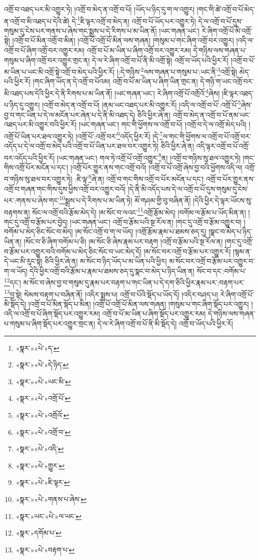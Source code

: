 འགྲོ་བ་འཐད་པར་མི་འགྱུར་ཏེ། །འགྲོ་བ་མེད་ན་འགྲོ་བ་པོ། །ཡོད་པ་ཉིད་དུ་ག་ལ་འགྱུར། །གང་གི་ཚེ་འགྲོ་བ་པོ་མེད་ན་འགྲོ་བ་མི་འཐད་པ་དེའི་ཚེ། དེ་\footnote{«སྣར་»«པེ་»ད་}ཇི་ལྟར་འགྲོ་བ་མེད་ན། འགྲོ་བ་པོ་ཡོད་པར་འགྱུར་ཏེ། དེ་ལ་འགྲོ་བ་པོ་དུས་གསུམ་དུ་ངེས་པར་གནས་པ་ཞེས་གང་སྨྲས་པ་དེ་རིགས་པ་མ་ཡིན་ནོ། །ཡང་གཞན་ཡང་། རེ་ཞིག་འགྲོ་པོ་མི་འགྲོ་སྟེ། །འགྲོ་བ་པོ་མིན་འགྲོ་བ་མིན། །འགྲོ་པོ་འགྲོ་པོ་མིན་ལས་གཞན། །གསུམ་པ་གང་ཞིག་འགྲོ་བར་འགྱུར། །འདི་ལ་འགྲོ་བ་པོ་ཞིག་འགྲོ་བར་འགྱུར་རམ། འགྲོ་བ་པོ་མ་ཡིན་པ་ཞིག་འགྲོ་བར་འགྱུར་རམ། དེ་གཉིས་ལས་གཞན་པ་གསུམ་པ་ཞིག་འགྲོ་བར་འགྱུར་གྲང་ན། དེ་ལ་རེ་ཞིག་འགྲོ་བ་པོ་ནི་མི་འགྲོ་སྟེ། འགྲོ་བ་ཡོད་པའི་ཕྱིར་རོ། །འགྲོ་བ་པོ་མ་ཡིན་པ་ཡང་མི་འགྲོ་སྟེ་འགྲོ་བ་མེད་པའི་ཕྱིར་རོ། །:དེ་གཉིས་\footnote{«སྣར་»«པེ་»དེ་ཉིད་}ལས་གཞན་པ་གསུམ་པ་:ཡང་ནི་\footnote{«སྣར་»«པེ་»ཡང་མི་}འགྲོ་སྟེ། མེད་པའི་ཕྱིར་རོ། །གང་ཞིག་ཡོད་ན་དེ་འགྲོ་བ་པོའམ། འགྲོ་བ་པོ་མ་ཡིན་པ་ཞིག་ཡིན་གྲང་ན། དེ་གཉི་ག་ཡང་འགྲོ་བར་མི་འཐད་པས་དེའི་ཕྱིར་དེ་ནི་རིགས་པ་མ་ཡིན་ནོ། །ཡང་གཞན་ཡང་། རེ་ཞིག་འགྲོ་པོ་འགྲོའོ་\footnote{«སྣར་»«པེ་»འགྲོ་པོ་}ཞེས། །ཇི་ལྟར་འཐད་པ་ཉིད་དུ་འགྱུར། །འགྲོ་བ་མེད་ན་འགྲོ་བ་པོ། །ནམ་ཡང་འཐད་པར་མི་འགྱུར་རོ། །འདི་ལ་འགྲོ་བ་པོ་:འགྲོ་པོ་\footnote{«སྣར་»«པེ་»འགྲོའོ་}ཞེས་བྱ་བ་གང་ཡིན་པ་དེ་ལ་མངོན་པར་ཞེན་པ་དེ་ནི་མི་འཐད་དེ། ཅིའི་ཕྱིར་ཞེ་ན། འགྲོ་བ་མེད་ན་འགྲོ་བ་པོ་ནམ་ཡང་འཐད་པར་མི་འགྱུར་བའི་ཕྱིར་རོ། །ཡང་གཞན་ཡང་། གང་གི་ཕྱོགས་ལ་འགྲོ་བ་པོ། །འགྲོ་བ་དེ་ལ་འགྲོ་མེད་པའི། །འགྲོ་པོ་ཡིན་པར་ཐལ་འགྱུར་ཏེ། །འགྲོ་པོ་:འགྲོ་བར་\footnote{«སྣར་»«པེ་»འགྲོ་བ་}འདོད་ཕྱིར་རོ། །དེ་\footnote{«སྣར་»«པེ་»འདི་}ལ་གང་གི་ཕྱོགས་ལ་འགྲོ་བ་པོ་འགྲོ་བར་འདོད་པ་དེ་ལ་འགྲོ་བ་མེད་པའི་འགྲོ་བ་པོ་ཡིན་པར་ཐལ་བར་འགྱུར་ཏེ། ཅིའི་ཕྱིར་ཞེ་ན། འདི་ལྟར་འགྲོ་བ་པོ་འགྲོ་བར་འདོད་པའི་ཕྱིར་རོ། །ཡང་གཞན་ཡང་། གལ་ཏེ་འགྲོ་པོ་འགྲོ་འགྱུར་\footnote{«སྣར་»«པེ་»གྱུར་}ན། །འགྲོ་བ་གཉིས་སུ་ཐལ་འགྱུར་ཏེ། །གང་གིས་འགྲོ་པོར་མངོན་པ་དང་། །འགྲོ་པོར་གྱུར་ནས་གང་འགྲོ་བའོ། །འགྲོ་བ་པོ་འགྲོ་ཞེས་བྱ་བའི་ཕྱོགས་འདི་ལ། འགྲོ་བ་གཉིས་སུ་ཐལ་བར་འགྱུར་ཏེ། :ཇི་ལྟ་\footnote{«སྣར་»«པེ་»ཇི་ལྟར་}ཞེ་ན། འགྲོ་བ་གང་གིས་འགྲོ་བ་པོར་མངོན་པ་དང་། འགྲོ་བ་པོར་གྱུར་ནས་འགྲོ་བ་གཞན་གང་གིས་དུས་ཕྱིས་འགྲོ་བར་འགྱུར་བའོ། །དེ་ནི་མི་འདོད་པས་དེ་ལ་འགྲོ་བ་པོ་དུས་གསུམ་དུ་ངེས་པར་:གནས་པ་ཞེས་གང་\footnote{«སྣར་»«པེ་»གནས་པ་ཞེས་}སྨྲས་པ་དེ་རིགས་པ་མ་ཡིན་ཏེ། མོ་གཤམ་གྱི་བུ་བཞིན་ནོ། །དེའི་ཕྱིར་དེ་ལྟར་ཡོངས་སུ་བརྟགས་ན། སོང་ལ་འགྲོ་བའི་རྩོམ་མེད་དེ། །མ་སོང་བ་ལའང་\footnote{«སྣར་»ཡང་«པེ་»ལ་ཡང་}འགྲོ་རྩོམ་མེད། །བགོམ་ལ་རྩོམ་པ་ཡོད་མིན་ན། །གང་དུ་འགྲོ་བ་རྩོམ་པར་བྱེད། །ཡང་གཞན་ཡང་། འགྲོ་བ་རྩོམ་པའི་སྔ་རོལ་ན། །གང་དུ་འགྲོ་བ་རྩོམ་འགྱུར་བ། །བགོམ་པ་མེད་ཅིང་སོང་བ་མེད། །མ་སོང་འགྲོ་བ་ག་ལ་ཡོད། །འགྲོ་རྩོམ་རྣམ་པ་ཐམས་ཅད་དུ། །སྣང་བ་མེད་པ་ཉིད་ཡིན་ན། །སོང་བ་ཅི་ཞིག་བགོམ་པ་ཅི། །མ་སོང་ཅི་ཞེས་རྣམ་པར་བརྟག །འགྲོ་བ་རྩོམ་པའི་སྔ་རོལ་ན། །གང་དུ་འགྲོ་བ་རྩོམ་པར་འགྱུར་བའི་བགོམ་པ་མེད་ཅིང་སོང་བ་ཡང་མེད་དོ། །མ་སོང་བར་འགྲོ་བ་རྩོམ་པར་འགྱུར་རོ། །སྙམ་ན་དེ་ཡང་མི་རུང་སྟེ། ཅིའི་ཕྱིར་ཞེ་ན། མ་སོང་བ་ཉིད་ཡོད་པ་མ་ཡིན་པའི་ཕྱིར། མ་སོང་བར་འགྲོ་བ་རྩོམ་པར་འགྱུར་བ་ག་ལ་ཡོད། དེའི་ཕྱིར་འགྲོ་བའི་རྩོམ་པ་རྣམ་པ་ཐམས་ཅད་དུ་སྣང་བ་མེད་པ་ཉིད་ཡིན་ན། སོང་བ་དང་:བགོམ་པ་\footnote{«སྣར་»དགོམ་པ་}དང་། མ་སོང་བ་ཞེས་བྱ་བ་གསུམ་དུ་རྣམ་པར་བརྟག་པ་གང་ཡིན་པ་དེ་དག་ཅིའི་ཕྱིར་རྣམ་པར་:བརྟག་པར་\footnote{«སྣར་»«པེ་»བརྟག་པ་}བྱ་སྟེ། སེམས་བརྟག་པ་བཞིན་ནོ། །འདིར་སྨྲས་པ། འགྲོ་བ་པོའི་སྡོད་པ་ཡོད་དོ། །འདིར་བཤད་པ། རེ་ཞིག་འགྲོ་པོ་མི་སྡོད་དེ། །འགྲོ་བ་པོ་མིན་སྡོད་པ་མིན། །འགྲོ་པོ་འགྲོ་པོ་མིན་ལས་གཞན། །གསུམ་པ་གང་ཞིག་སྡོད་པར་འགྱུར། །འདི་ལ་འགྲོ་བ་པོ་ཞིག་སྡོད་པར་འགྱུར་རམ། འགྲོ་བ་པོ་མ་ཡིན་པ་ཞིག་སྡོད་པར་འགྱུར་རམ། དེ་གཉིས་ལས་གཞན་པ་གསུམ་པ་ཞིག་སྡོད་པར་འགྱུར་གྲང་ན། དེ་ལ་རེ་ཞིག་འགྲོ་བ་པོ་ནི་མི་སྡོད་དེ། འགྲོ་བ་ཡོད་པའི་ཕྱིར་རོ། 